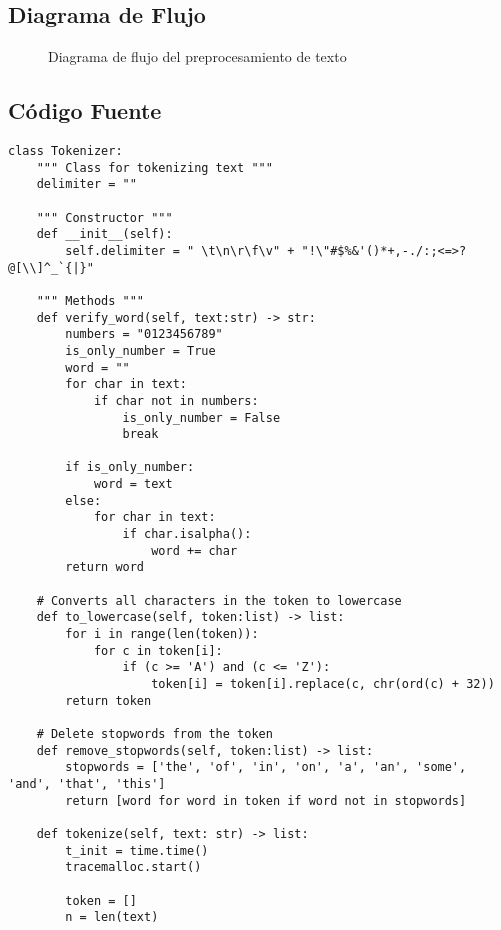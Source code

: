 \documentclass[12pt,a4paper]{article}
\begin{document}
\subsection{Diagrama de Flujo}

\begin{figure}[H]
    \centering
    
    \caption{Diagrama de flujo del preprocesamiento de texto}
    \label{fig:diagrama_preprocesamiento}
\end{figure}

\subsection{Código Fuente}

\begin{lstlisting}[caption=Tokenizer con preprocesamiento]
class Tokenizer:
    """ Class for tokenizing text """
    delimiter = ""
    
    """ Constructor """
    def __init__(self):
        self.delimiter = " \t\n\r\f\v" + "!\"#$%&'()*+,-./:;<=>?@[\\]^_`{|}"

    """ Methods """
    def verify_word(self, text:str) -> str:
        numbers = "0123456789"
        is_only_number = True
        word = ""
        for char in text:
            if char not in numbers:
                is_only_number = False
                break 

        if is_only_number:
            word = text
        else:
            for char in text:
                if char.isalpha():
                    word += char
        return word
    
    # Converts all characters in the token to lowercase
    def to_lowercase(self, token:list) -> list:
        for i in range(len(token)):
            for c in token[i]:
                if (c >= 'A') and (c <= 'Z'):
                    token[i] = token[i].replace(c, chr(ord(c) + 32))
        return token
    
    # Delete stopwords from the token
    def remove_stopwords(self, token:list) -> list:
        stopwords = ['the', 'of', 'in', 'on', 'a', 'an', 'some', 'and', 'that', 'this']
        return [word for word in token if word not in stopwords]
        
    def tokenize(self, text: str) -> list:              
        t_init = time.time()
        tracemalloc.start()
        
        token = []
        n = len(text)
        

\end{lstlisting}
\end{document}
